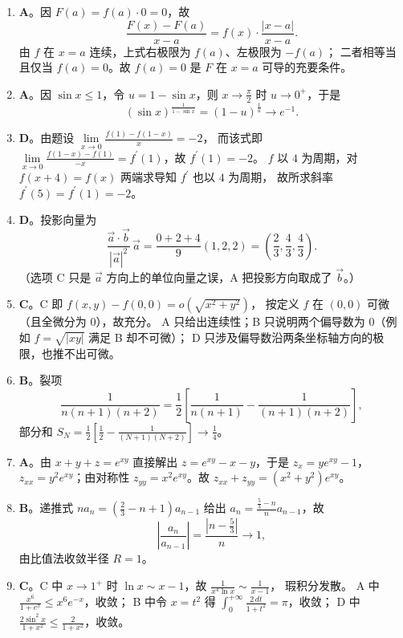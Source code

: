 \begin{enumerate}
{\begin{enumerate}
	\item
	\textbf{A}。因 $F(a)=f(a)\cdot0=0$，故
	\[
	\frac{F(x)-F(a)}{x-a}=f(x)\cdot\frac{|x-a|}{x-a} .
	\]
	由 $f$ 在 $x=a$ 连续，上式右极限为 $f(a)$、左极限为 $-f(a)$；
	二者相等当且仅当 $f(a)=0$。故 $f(a)=0$ 是 $F$ 在 $x=a$ 可导的充要条件。

	\item
	\textbf{A}。因 $\sin x\leqslant1$，令 $u=1-\sin x$，则 $x\to\frac{\pi}{2}$ 时 $u\to0^{+}$，于是
	\[
	(\sin x)^{\frac{1}{1-\sin x}}=(1-u)^{\frac1u}\longrightarrow e^{-1} .
	\]

	\item
	\textbf{D}。由题设 $\lim\limits_{x\to0}\frac{f(1)-f(1-x)}{x}=-2$，
	而该式即 $\lim\limits_{x\to0}\frac{f(1-x)-f(1)}{-x}=f^{\prime}(1)$，故 $f^{\prime}(1)=-2$。
	$f$ 以 $4$ 为周期，对 $f(x+4)=f(x)$ 两端求导知 $f^{\prime}$ 也以 $4$ 为周期，
	故所求斜率 $f^{\prime}(5)=f^{\prime}(1)=-2$。

	\item
	\textbf{D}。投影向量为
	\[
	\frac{\vec{a}\cdot\vec{b}}{|\vec{a}|^{2}}\,\vec{a}
	=\frac{0+2+4}{9}(1,2,2)=\left(\frac23,\frac43,\frac43\right).
	\]
	（选项 C 只是 $\vec{a}$ 方向上的单位向量之误，A 把投影方向取成了 $\vec{b}$。）

	\item
	\textbf{C}。C 即 $f(x,y)-f(0,0)=o\left(\sqrt{x^2+y^2}\right)$，
	按定义 $f$ 在 $(0,0)$ 可微（且全微分为 $0$），故充分。
	A 只给出连续性；B 只说明两个偏导数为 $0$（例如 $f=\sqrt{|xy|}$ 满足 B 却不可微）；
	D 只涉及偏导数沿两条坐标轴方向的极限，也推不出可微。

	\item
	\textbf{B}。裂项
	\[
	\frac{1}{n(n+1)(n+2)}=\frac12\left[\frac{1}{n(n+1)}-\frac{1}{(n+1)(n+2)}\right],
	\]
	部分和 $S_N=\frac12\left[\frac12-\frac{1}{(N+1)(N+2)}\right]\to\frac14$。

	\item
	\textbf{A}。由 $x+y+z=e^{xy}$ 直接解出 $z=e^{xy}-x-y$，于是
	$z_x=ye^{xy}-1$，$z_{xx}=y^2e^{xy}$；由对称性 $z_{yy}=x^2e^{xy}$。故
	$z_{xx}+z_{yy}=\left(x^2+y^2\right)e^{xy}$。

	\item
	\textbf{B}。递推式 $na_n=\left(\frac23-n+1\right)a_{n-1}$ 给出
	$a_n=\frac{\frac53-n}{n}a_{n-1}$，故
	\[
	\left|\frac{a_n}{a_{n-1}}\right|=\frac{\left|n-\frac53\right|}{n}\longrightarrow1 ,
	\]
	由比值法收敛半径 $R=1$。

	\item
	\textbf{C}。C 中 $x\to1^{+}$ 时 $\ln x\sim x-1$，故 $\frac{1}{x^4\ln x}\sim\frac{1}{x-1}$，
	瑕积分发散。
	A 中 $\frac{x^6}{1+e^x}\leqslant x^6e^{-x}$，收敛；
	B 中令 $x=t^2$ 得 $\int_0^{+\infty}\frac{2\,dt}{1+t^2}=\pi$，收敛；
	D 中 $\frac{2\sin^2x}{1+x^2}\leqslant\frac{2}{1+x^2}$，收敛。
\end{enumerate}

}
\end{enumerate}
